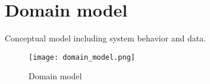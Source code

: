\section{Domain model}
Conceptual model including system behavior and data.
\begin{figure}[h]
	\centering
	\caption{Domain model}
	\texttt{[image: domain\_model.png]}
\end{figure}
